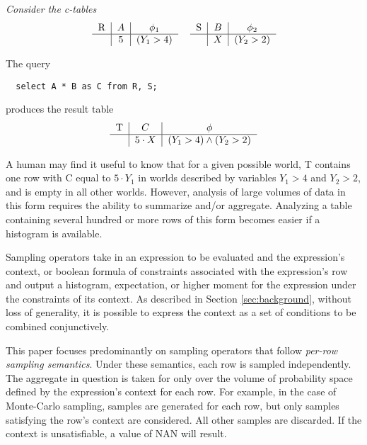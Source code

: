 \begin{example}\em
Consider the c-tables 
\[
\begin{tabular}{lr}
\begin{tabular}{c|c|c}
R & $A$ & $\phi_1$\\
\hline
& $5$ & $(Y_1 > 4)$ 
\end{tabular} & \begin{tabular}{c|c|c}
 S & $B$ & $\phi_2$ \\
\hline
& $X$ & $(Y_2 > 2)$
\end{tabular}
\end{tabular}
\]

The query {\small\begin{verbatim}
  select A * B as C from R, S;
\end{verbatim}} produces the result table
\[
\begin{tabular}{c|c|c}
T & $C$ & $\phi$\\
\hline
& $5\cdot X$ & $(Y_1 > 4) \wedge (Y_2 > 2)$ 
\end{tabular}
\]

A human may find it useful to know that for a given possible world, T contains one row with C equal to $5 \cdot Y_1$ in worlds described by variables $Y_1 > 4$ and $Y_2 > 2$, and is empty in all other worlds.  However, analysis of large volumes of data in this form requires the ability to summarize and/or aggregate.  Analyzing a table containing several hundred or more rows of this form becomes easier if a histogram is available.
\end{example}

Sampling operators take in an expression to be evaluated and the expression's context, or boolean formula of constraints associated with the expression's row and output a histogram, expectation, or higher moment for the expression under the constraints of its context.  As described in Section \ref{sec:background}, without loss of generality, it is possible to express the context as a set of conditions to be combined conjunctively.  

This paper focuses predominantly on sampling operators that follow \textit{per-row sampling semantics}.  Under these semantics, each row is sampled independently.  The aggregate in question is taken for only over the volume of probability space defined by the expression's context for each row.  For example, in the case of Monte-Carlo sampling, samples are generated for each row, but only samples satisfying the row's context are considered.  All other samples are discarded.  If the context is unsatisfiable, a value of NAN will result.

